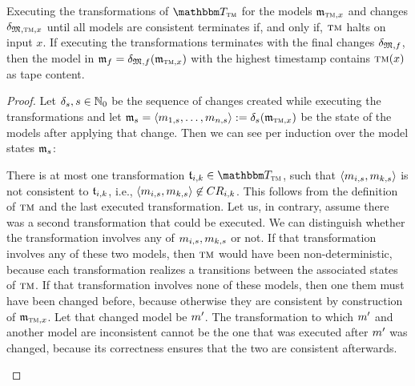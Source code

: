 \begin{lemma}
    \label{lemma:turing_machine_construction}
    Executing the transformations of $\transformationset{T}_{\TuringMachine}$ for the models $\mathfrak{m}_{\textsc{tm},x}$ and changes $\mathfrak{\delta}_{\mathfrak{M},\textsc{tm},x}$ until all models are consistent %
    terminates if, and only if, $\textsc{tm}$ halts on input $x$.
	If executing the transformations terminates with the final changes $\mathfrak{\delta}_{\mathfrak{M},f}$, then the model in $\mathfrak{m}_{f} = \mathfrak{\delta}_{\mathfrak{M},f}(\mathfrak{m}_{\textsc{tm},x})$ with the highest timestamp contains $\textsc{tm}(x)$ as tape content.
\end{lemma}
\begin{proof}
    Let $\mathfrak{\delta}_{s}, s \in \mathbb{N}_0$ be the sequence of changes created while executing the transformations and let $\mathfrak{m}_{s} = \langle m_{1,s}, \dots, m_{n,s} \rangle:= \mathfrak{\delta}_{s}(\mathfrak{m}_{\textsc{tm},x})$ be the state of the models after applying that change.
    Then we can see per induction over the model states $\mathfrak{m}_{s}$:
	\begin{properenumerate} %
        \item 
            There is at most one transformation $\transformation{t}_{i,k} \in \transformationset{T}_{\TuringMachine}$, such that $\langle m_{i,s},m_{k,s} \rangle$ is not consistent to $\mathfrak{t}_{i,k}$, i.e., $\langle m_{i,s},m_{k,s} \rangle \not\in CR_{i,k}$.
            This follows from the definition of $\textsc{tm}$ and the last executed transformation.
            Let us, in contrary, assume there was a second transformation that could be executed. 
            We can distinguish whether the transformation involves any of $m_{i,s},m_{k,s}$ or not.
            If that transformation involves any of these two models, then $\textsc{tm}$ would have been non-deterministic, because each transformation realizes a transitions between the associated states of $\textsc{tm}$.
            If that transformation involves none of these models, then one them must have been changed before, because otherwise they are consistent by construction of $\mathfrak{m}_{\textsc{tm},x}$.
            Let that changed model be $m_{}'$.
            The transformation to which $m_{}'$ and another model are inconsistent cannot be the one that was executed after $m_{}'$ was changed, because its correctness ensures that the two are consistent afterwards.

\end{properenumerate}
\end{proof}
